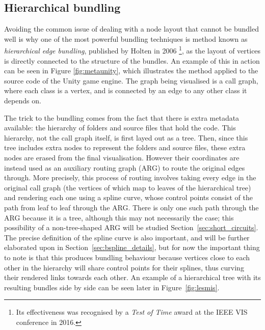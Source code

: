 \subsection{Hierarchical bundling}
\label{sec:heb_background}
Avoiding the common issue of dealing with a node layout that cannot be bundled well is why one of the most powerful bundling techniques is method known as \emph{hierarchical edge bundling}, published by Holten in 2006 \cite{Holten2006}\footnote{Its effectiveness was recognised by a \emph{Test of Time} award at the IEEE VIS conference in 2016.}, as the layout of vertices is directly connected to the structure of the bundles.
An example of this in action can be seen in Figure \ref{fig:metaunity}, which illustrates the method applied to the source code of the Unity game engine. The graph being visualised is a call graph, where each class is a vertex, and is connected by an edge to any other class it depends on. 

The trick to the bundling comes from the fact that there is extra metadata available: the hierarchy of folders and source files that hold the code.
This hierarchy, not the call graph itself, is first layed out as a tree. Then, since this tree includes extra nodes to represent the folders and source files, these extra nodes are erased from the final visualisation. However their coordinates are instead used as an auxiliary routing graph (ARG) to route the original edges through.
More precisely, this process of routing involves taking every edge in the original call graph (the vertices of which map to leaves of the hierarchical tree) and rendering each one using a spline curve, whose control points consist of the path from leaf to leaf through the ARG. There is only one such path through the ARG because it is a tree, although this may not necessarily the case; this possibility of a non-tree-shaped ARG will be studied Section~\ref{sec:short_circuits}. The precise definition of the spline curve is also important, and will be further elaborated upon in Section~\ref{sec:bspline_details}, but for now the important thing to note is that this produces bundling behaviour because vertices close to each other in the hierarchy will share control points for their splines, thus curving their rendered links towards each other.
An example of a hierarchical tree with its resulting bundles side by side can be seen later in Figure~\ref{fig:lesmis}.

